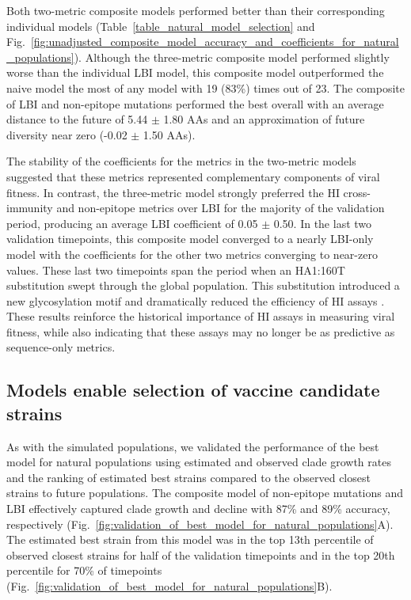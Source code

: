 Both two-metric composite models performed better than their corresponding individual models (Table~\ref{table_natural_model_selection} and Fig.~\ref{fig:unadjusted_composite_model_accuracy_and_coefficients_for_natural_populations}).
Although the three-metric composite model performed slightly worse than the individual LBI model, this composite model outperformed the naive model the most of any model with 19 (83\%) times out of 23.
The composite of LBI and non-epitope mutations performed the best overall with an average distance to the future of 5.44 $\pm$ 1.80 AAs and an approximation of future diversity near zero (-0.02 $\pm$ 1.50 AAs).

The stability of the coefficients for the metrics in the two-metric models suggested that these metrics represented complementary components of viral fitness.
In contrast, the three-metric model strongly preferred the HI cross-immunity and non-epitope metrics over LBI for the majority of the validation period, producing an average LBI coefficient of 0.05 $\pm$ 0.50.
In the last two validation timepoints, this composite model converged to a nearly LBI-only model with the coefficients for the other two metrics converging to near-zero values.
These last two timepoints span the period when an HA1:160T substitution swept through the global population.
This substitution introduced a new glycosylation motif and dramatically reduced the efficiency of HI assays \cite{Zost2017}.
These results reinforce the historical importance of HI assays in measuring viral fitness, while also indicating that these assays may no longer be as predictive as sequence-only metrics.

\subsection*{Models enable selection of vaccine candidate strains}

As with the simulated populations, we validated the performance of the best model for natural populations using estimated and observed clade growth rates and the ranking of estimated best strains compared to the observed closest strains to future populations.
The composite model of non-epitope mutations and LBI effectively captured clade growth and decline with 87\% and 89\% accuracy, respectively (Fig.~\ref{fig:validation_of_best_model_for_natural_populations}A).
The estimated best strain from this model was in the top 13th percentile of observed closest strains for half of the validation timepoints and in the top 20th percentile for 70\% of timepoints (Fig.~\ref{fig:validation_of_best_model_for_natural_populations}B).

